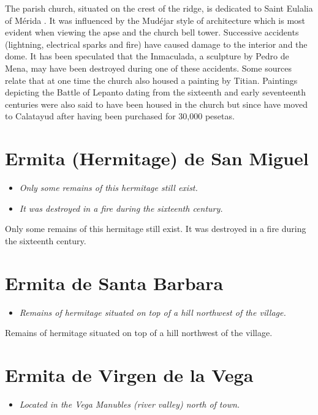 The parish church, situated on the crest of the ridge, is dedicated to
Saint Eulalia of Mérida . It was influenced by the Mudéjar style of
architecture which is most evident when viewing the apse and the church
bell tower. Successive accidents (lightning, electrical sparks and fire)
have caused damage to the interior and the dome. It has been speculated
that the Inmaculada, a sculpture by Pedro de Mena, may have been
destroyed during one of these accidents. Some sources relate that at one
time the church also housed a painting by Titian. Paintings depicting
the Battle of Lepanto dating from the sixteenth and early seventeenth
centuries were also said to have been housed in the church but since
have moved to Calatayud after having been purchased for 30,000 pesetas.

\section{Ermita (Hermitage) de San
Miguel}\label{ermita-hermitage-de-san-miguel}

\begin{itemize}
\item
  \emph{Only some remains of this hermitage still exist.}
\item
  \emph{It was destroyed in a fire during the sixteenth century.}
\end{itemize}

Only some remains of this hermitage still exist. It was destroyed in a
fire during the sixteenth century.

\section{Ermita de Santa Barbara}\label{ermita-de-santa-barbara}

\begin{itemize}
\item
  \emph{Remains of hermitage situated on top of a hill northwest of the
  village.}
\end{itemize}

Remains of hermitage situated on top of a hill northwest of the village.

\section{Ermita de Virgen de la Vega}\label{ermita-de-virgen-de-la-vega}

\begin{itemize}
\item
  \emph{Located in the Vega Manubles (river valley) north of town.}
\end{itemize}

